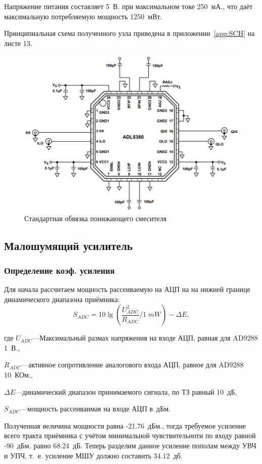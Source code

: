 \documentclass[utf8x, 14pt, oneside, a4paper]{article}
\begin{document}
				Напряжение питания составляет 5~В. при максимальном токе 250~мА., что даёт максимальную потребляемую мощность 1250~мВт.
				
				Принципиальная схема полученного узла приведена в приложении~\ref{app:SCH} на листе 13.
				\begin{figure}[h!]
					\centering
					\includegraphics[width=0.7\linewidth]{"Обвязка демодулятора"}
					\caption{Стандартная обвязка понижающего смесителя}
					\label{fig:обвязка:демод}
				\end{figure}
			
		\subsection{Малошумящий усилитель}
			\subsubsection{Определение коэф. усиления}
				Для начала рассчитаем мощность рассеиваемую на АЦП на на нижней границе динамического диапазона приёмника:
				\begin{equation}\label{equ:ADC-Power}
					S_{ADC}=10\lg\left(\frac{U_{ADC}^{2}}{R_{ADC}}/1~mW\right)-\Delta{}E,
				\end{equation}
			
				где $U_{ADC}$---Максимальный размах напряжения на входе АЦП, равная для AD9288 1~В.,
				
				$R_{ADC}$---активное сопротивление аналогового входа АЦП, равное для AD9288 10~КОм.,
				
				$\Delta{}E$---динамический диапазон принимаемого сигнала, по ТЗ равный 10~дБ,
				
				$S_{ADC}$---мощность рассеиваимая на входе АЦП в~дБм.
				
				Полученная величина мощности равна -21.76~дБм., тогда требуемое усиление всего тракта приёмника с учётом минимальной чувствительноти по входу равной -90~дБм. равно 68.24~дБ. Теперь разделим данное усиление пополам между УВЧ и УПЧ, т.~е. усиление МШУ должно составить 34.12~дб.
				  
\end{document}
